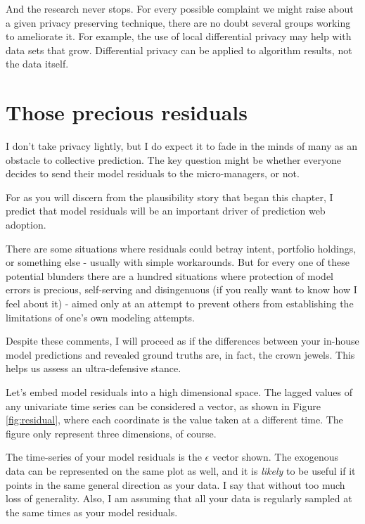 And the research never stops. For every possible complaint we might raise about a given privacy preserving technique, there are no doubt several groups working to ameliorate it. For example, the use of local differential privacy may help with data sets that grow. Differential privacy can be applied to algorithm results, not the data itself. 


\section{Those precious residuals}

I don't take privacy lightly, but I do expect it to fade in the minds of many as an obstacle to collective prediction. The key question might be whether everyone decides to send their model residuals to the micro-managers, or not. 

For as you will discern from the plausibility story that began this chapter, I predict that model residuals will be an important driver of prediction web adoption. 

There are some situations where residuals could betray intent, portfolio holdings, or something else - usually with simple workarounds. But for every one of these potential blunders there are a hundred situations where protection of model errors is precious, self-serving and disingenuous (if you really want to know how I feel about it) - aimed only at an attempt to prevent others from establishing the limitations of one's own modeling attempts.
 
Despite these comments, I will proceed as if the differences between your in-house model predictions and revealed ground truths are, in fact, the crown jewels. This helps us assess an ultra-defensive stance. 


Let's embed model residuals into a high dimensional space. The lagged values of any univariate time series can be considered a vector, as shown in Figure \ref{fig:residual}, where each coordinate is the value taken at a different time. The figure only represent three dimensions, of course. 


The time-series of your model residuals is the $\epsilon$ vector shown. The exogenous data can be represented on the same plot as well, and it is {\em likely} to be useful if it points in the same general direction as your data. I say that without too much loss of generality. Also, I am assuming that all your data is regularly sampled at the same times as your model residuals.


